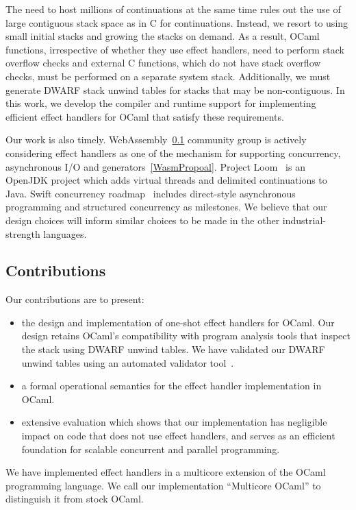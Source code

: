 \documentclass[sigplan,10pt,review,anonymous]{acmart}\settopmatter{printfolios=true,printccs=false,printacmref=false}
\begin{document}
The need to host millions of continuations at the same time rules out the use
of large contiguous stack space as in C for continuations. Instead, we resort
to using small initial stacks and growing the stacks on demand. As a result,
OCaml functions, irrespective of whether they use effect handlers, need to
perform stack overflow checks and external C functions, which do not have stack
overflow checks, must be performed on a separate system stack. Additionally, we
must generate DWARF stack unwind tables for stacks that may be non-contiguous.
In this work, we develop the compiler and runtime support for implementing
efficient effect handlers for OCaml that satisfy these requirements.

Our work is also timely. WebAssembly~\ref{} community group is actively
considering effect handlers as one of the mechanism for supporting concurrency,
asynchronous I/O and generators~\ref{WasmPropoal}. Project Loom~\cite{} is an
OpenJDK project which adds virtual threads and delimited continuations to Java.
Swift concurrency roadmap~\cite{} includes direct-style asynchronous
programming and structured concurrency as milestones. We believe that our
design choices will inform similar choices to be made in the other
industrial-strength languages.

\subsection{Contributions}

Our contributions are to present:

\begin{itemize}
  \item the design and implementation of one-shot effect handlers for OCaml.
    Our design retains OCaml's compatibility with program analysis tools that
    inspect the stack using DWARF unwind tables. We have validated our DWARF
    unwind tables using an automated validator tool~\cite{}.
  \item a formal operational semantics for the effect handler implementation in
    OCaml.
  \item extensive evaluation which shows that our implementation has negligible
    impact on code that does not use effect handlers, and serves as an
    efficient foundation for scalable concurrent and parallel programming.
\end{itemize}

We have implemented effect handlers in a multicore extension of the OCaml
programming language. We call our implementation ``Multicore OCaml'' to
distinguish it from stock OCaml.
\end{document}
